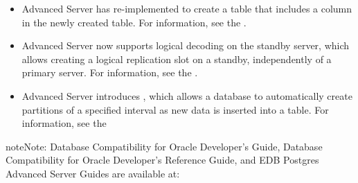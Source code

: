 \documentclass[letterpaper,10pt,english,openany,oneside]{sphinxmanual}
\begin{document}
\begin{itemize}
\item {} 
Advanced Server has re-implemented  to create a
table that includes a  column in the newly created table. For
information, see the .

\item {} 
Advanced Server now supports logical decoding on the standby server,
which allows creating a logical replication slot on a standby,
independently of a primary server. For information, see the .

\item {} 
Advanced Server introduces , which allows a
database to automatically create partitions of a specified interval
as new data is inserted into a table. For information, see the

\end{itemize}

\begin{sphinxadmonition}{note}{Note:}
Database Compatibility for Oracle Developer’s Guide, Database Compatibility for Oracle Developer’s Reference Guide, and EDB Postgres Advanced Server Guides are available at:

\end{sphinxadmonition}
\end{document}
